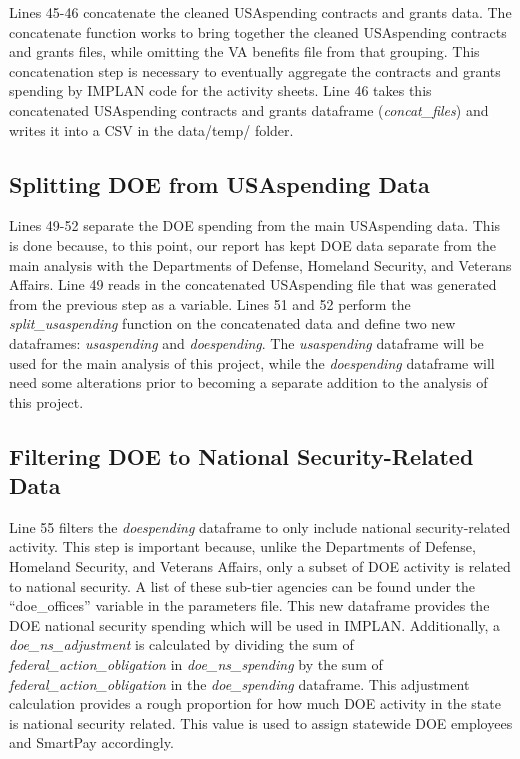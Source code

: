 \documentclass[
]{book}
\begin{document}
Lines 45-46 concatenate the cleaned USAspending contracts and grants data. The concatenate function works to bring together the cleaned USAspending contracts and grants files, while omitting the VA benefits file from that grouping. This concatenation step is necessary to eventually aggregate the contracts and grants spending by IMPLAN code for the activity sheets. Line 46 takes this concatenated USAspending contracts and grants dataframe (\emph{concat\_files}) and writes it into a CSV in the data/temp/ folder.

\hypertarget{split-doe}{%
\subsection{Splitting DOE from USAspending Data}\label{split-doe}}

Lines 49-52 separate the DOE spending from the main USAspending data. This is done because, to this point, our report has kept DOE data separate from the main analysis with the Departments of Defense, Homeland Security, and Veterans Affairs. Line 49 reads in the concatenated USAspending file that was generated from the previous step as a variable. Lines 51 and 52 perform the \emph{split\_usaspending} function on the concatenated data and define two new dataframes: \emph{usaspending} and \emph{doespending}. The \emph{usaspending} dataframe will be used for the main analysis of this project, while the \emph{doespending} dataframe will need some alterations prior to becoming a separate addition to the analysis of this project.

\hypertarget{filter-doe}{%
\subsection{Filtering DOE to National Security-Related Data}\label{filter-doe}}

Line 55 filters the \emph{doespending} dataframe to only include national security-related activity. This step is important because, unlike the Departments of Defense, Homeland Security, and Veterans Affairs, only a subset of DOE activity is related to national security. A list of these sub-tier agencies can be found under the ``doe\_offices'' variable in the parameters file. This new dataframe provides the DOE national security spending which will be used in IMPLAN. Additionally, a \emph{doe\_ns\_adjustment} is calculated by dividing the sum of \emph{federal\_action\_obligation} in \emph{doe\_ns\_spending} by the sum of \emph{federal\_action\_obligation} in the \emph{doe\_spending} dataframe. This adjustment calculation provides a rough proportion for how much DOE activity in the state is national security related. This value is used to assign statewide DOE employees and SmartPay accordingly.
\end{document}
